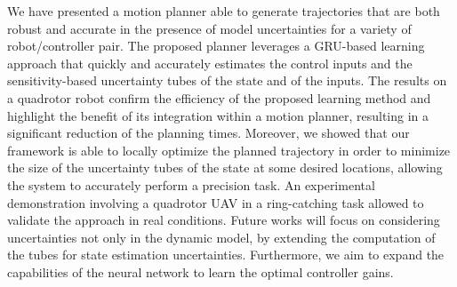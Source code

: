 We have presented a motion planner able to generate trajectories that are both robust and accurate in the presence of model uncertainties for a variety of robot/controller pair. The proposed planner leverages a GRU-based learning approach that quickly and accurately estimates the control inputs and the sensitivity-based uncertainty tubes of the state and of the inputs. 
The results on a quadrotor robot confirm the efficiency of the proposed learning method and highlight the benefit of its integration within a motion planner, resulting in a significant reduction of the planning times. 
Moreover, we showed that our framework is able to locally optimize the planned trajectory in order to minimize the size of the uncertainty tubes of the state at some desired locations, allowing the system to accurately perform a precision task. An experimental demonstration involving a quadrotor UAV in a ring-catching task allowed to validate the approach in real conditions. Future works will focus on considering uncertainties not only in the dynamic model, by extending the computation of the tubes for state estimation uncertainties. 
Furthermore, we aim to expand the capabilities of the neural network to learn the optimal controller gains.
